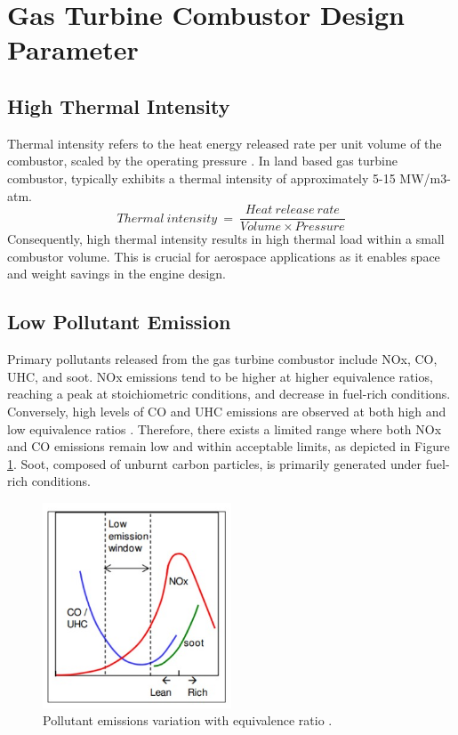 \section{Gas Turbine Combustor Design Parameter}
\subsection{High Thermal Intensity}
Thermal intensity refers to the heat energy released rate per unit volume of the combustor, scaled by the operating pressure \cite{VAThesis2011}. In land based gas turbine combustor, typically exhibits a thermal intensity of approximately 5-15 MW/m3-atm. 
\begin{equation}
    Thermal\ intensity\ = \ \frac{Heat\ release\ rate}{Volume \times Pressure}
\end{equation}
Consequently, high thermal intensity results in high thermal load within a small combustor volume. This is crucial for aerospace applications as it enables space and weight savings in the engine design.

\subsection{Low Pollutant Emission}
Primary pollutants released from the gas turbine combustor include NOx, CO, UHC, and soot. NOx emissions tend to be higher at higher equivalence ratios, reaching a peak at stoichiometric conditions, and decrease in fuel-rich conditions. Conversely, high levels of CO and UHC emissions are observed at both high and low equivalence ratios \cite{AGARWAL20171}. Therefore, there exists a limited range where both NOx and CO emissions remain low and within acceptable limits, as depicted in Figure \ref{PollEq}. Soot, composed of unburnt carbon particles, is primarily generated under fuel-rich conditions.
\begin{figure}[ht]
	\centering
	\includegraphics[width=0.5\textwidth]{Chapter1/Images/emissionWithEq.jpeg}
	\caption[Pollutant emissions variation with equivalence ratio]{Pollutant emissions variation with equivalence ratio \cite{SKG2017}.}
	\label{PollEq}
\end{figure}

